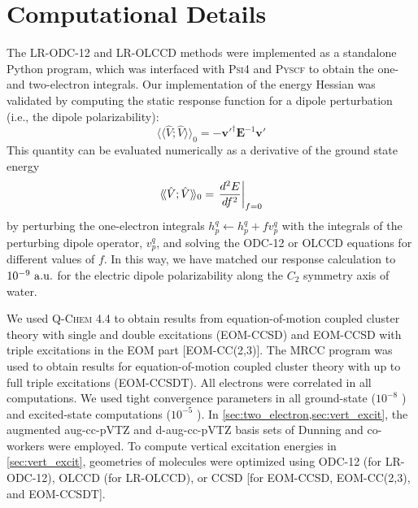 \section{Computational Details}
\label{sec:comp_details}
The LR-ODC-12 and LR-OLCCD methods were implemented as a standalone Python
program, which was interfaced with \textsc{Psi4}\cite{Parrish:2017p3185} and
\textsc{Pyscf}\cite{Sun:2018pe1340} to obtain the one- and two-electron
integrals.
Our implementation of the energy Hessian was validated by computing the static
response function for a dipole perturbation (i.e., the dipole polarizability):
\begin{equation}
    \langle\!\langle\hat{V}; \hat{V}\rangle\!\rangle_0
    =
    -
    \mathbf{v}'^\dagger
    \mathbf{E}^{-1}
    \mathbf{v}'
\end{equation}
This quantity can be evaluated numerically as a derivative of the ground state
energy
\begin{equation}
    \langle\!\langle\hat{V}; \hat{V}\rangle\!\rangle_0
    =
    \left.
    \frac{%
        d^2 E
    }{%
        df^2
    }
    \right|_{f=0}
\end{equation}
by perturbing the one-electron integrals
\(
    h_p^q
    \leftarrow
    h_p^q
    +
    f
    v_p^q
\)
with the integrals of the perturbing dipole operator, \(v_p^q\), and solving the
ODC-12 or OLCCD equations for different values of \(f\).
In this way, we have matched our response calculation to \(10^{-9}\ \mathrm{a.u.}\) for
the electric dipole polarizability along the \(C_2\) symmetry axis of water.


We used \textsc{Q-Chem} 4.4\cite{QChem} to obtain results from
equation-of-motion coupled cluster theory with single and double excitations
(EOM-CCSD) and EOM-CCSD with triple excitations in the EOM part [EOM-CC(2,3)].
The \textsc{MRCC} program\cite{MRCC} was used to obtain results for
equation-of-motion coupled cluster theory with up to full triple excitations
(EOM-CCSDT).
All electrons were correlated in all computations.
We used tight convergence parameters in all ground-state ($10^{-8}$ \hartree)
and excited-state computations ($10^{-5}$ \hartree).
In \cref{sec:two_electron,sec:vert_excit}, the augmented aug-cc-pVTZ and
d-aug-cc-pVTZ basis sets of Dunning and co-workers were
employed.\cite{Kendall:1992p6796}
To compute vertical excitation energies in \cref{sec:vert_excit}, geometries of
molecules were optimized using ODC-12 (for LR-ODC-12), OLCCD (for LR-OLCCD), or
CCSD [for EOM-CCSD, EOM-CC(2,3), and EOM-CCSDT].

